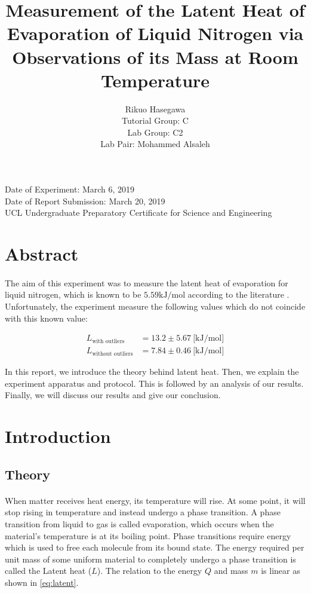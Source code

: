 \documentclass{article}
\title{Measurement of the Latent Heat of Evaporation of Liquid Nitrogen via Observations of its Mass at Room Temperature}
\author{ Rikuo Hasegawa
  \\ Tutorial Group: C
  \\ Lab Group: C2
  \\ Lab Pair: Mohammed Alsaleh}
\begin{document}
\maketitle
\thispagestyle{fancy}
\vspace*{\fill}
\parbox{\linewidth}{\centering%
Date of Experiment: March 6, 2019
\\ Date of Report Submission: March 20, 2019
\\ UCL Undergraduate Preparatory Certificate for Science and Engineering
}
\newpage

\section*{Abstract}
\paragraph{}

The aim of this experiment was to measure the latent heat of evaporation for liquid nitrogen, which is known to be $5.59 \text{kJ/mol}$ according to the literature \autocite{mohr_2016}. Unfortunately, the experiment measure the following values which do not coincide with this known value:

\begin{align*}
  L_{\text{with outliers}}    &= 13.2 \pm 5.67 ~ \text{[kJ/mol]} \\
  L_{\text{without outliers}} &= 7.84 \pm 0.46 ~ \text{[kJ/mol]}
\end{align*}

In this report, we introduce the theory behind latent heat. Then, we explain the experiment apparatus and protocol. This is followed by an analysis of our results. Finally, we will discuss our results and give our conclusion.

\section{Introduction}

\subsection{Theory}
\paragraph{}

When matter receives heat energy, its temperature will rise. At some point, it will stop rising in temperature and instead undergo a phase transition. A phase transition from liquid to gas is called evaporation, which occurs when the material's temperature is at its boiling point. Phase transitions require energy which is used to free each molecule from its bound state. The energy required per unit mass of some uniform material to completely undergo a phase transition is called the Latent heat ($L$). The relation to the energy $Q$ and mass $m$ is linear as shown in \eqref{eq:latent}.
\end{document}

